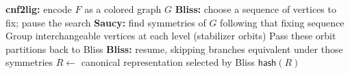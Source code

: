 \documentclass[border=2pt]{standalone}
\begin{document}
\begin{minipage}{15cm}
\begin{algorithm}[H]
\DontPrintSemicolon
\setcounter{algocf}{1}
\caption{Saucy/Bliss (simplified)}
\textbf{cnf2lig:} encode $F$ as a colored graph $G$\;
\textbf{Bliss:} choose a sequence of vertices to fix; pause the search\;
\textbf{Saucy:} find symmetries of $G$ following that fixing sequence\;
\Indp
Group interchangeable vertices at each level (stabilizer orbits)\;
Pass these orbit partitions back to Bliss\;
\Indm
\textbf{Bliss:} resume, skipping branches equivalent under those symmetries\;
$R\leftarrow$ canonical representation selected by Bliss\;
\Return $\mathsf{hash}(R)$\;
\end{algorithm}
\end{minipage}
\end{document}

